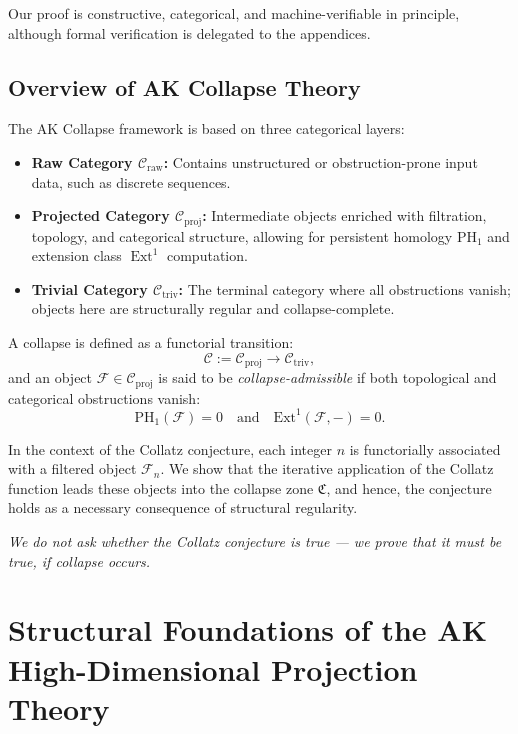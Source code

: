 \documentclass[11pt]{article}
\DeclareMathOperator{\Ext}{Ext}
\begin{document}
Our proof is constructive, categorical, and machine-verifiable in principle, although formal verification is delegated to the appendices.

\subsection{Overview of AK Collapse Theory}

The AK Collapse framework is based on three categorical layers:

\begin{itemize}
  \item \textbf{Raw Category \( \mathcal{C}_{\mathrm{raw}} \):} Contains unstructured or obstruction-prone input data, such as discrete sequences.

\item \textbf{Projected Category \( \mathcal{C}_{\mathrm{proj}} \):} Intermediate objects enriched with filtration, topology, and categorical structure, allowing for persistent homology \( \mathrm{PH}_1 \) and extension class \( \Ext^1 \) computation.


  \item \textbf{Trivial Category \( \mathcal{C}_{\mathrm{triv}} \):} The terminal category where all obstructions vanish; objects here are structurally regular and collapse-complete.
\end{itemize}

A collapse is defined as a functorial transition:
\[
\mathcal{C} := \mathcal{C}_{\mathrm{proj}} \to \mathcal{C}_{\mathrm{triv}},
\]
and an object \( \mathcal{F} \in \mathcal{C}_{\mathrm{proj}} \) is said to be \emph{collapse-admissible} if both topological and categorical obstructions vanish:
\[
\mathrm{PH}_1(\mathcal{F}) = 0 \quad \text{and} \quad \mathrm{Ext}^1(\mathcal{F}, -) = 0.
\]

In the context of the Collatz conjecture, each integer \( n \) is functorially associated with a filtered object \( \mathcal{F}_n \). We show that the iterative application of the Collatz function leads these objects into the collapse zone \( \mathfrak{C} \), and hence, the conjecture holds as a necessary consequence of structural regularity.

\begin{center}
\textit{We do not ask whether the Collatz conjecture is true — we prove that it must be true, if collapse occurs.}
\end{center}



\section{Structural Foundations of the AK High-Dimensional Projection Theory}
\end{document}
